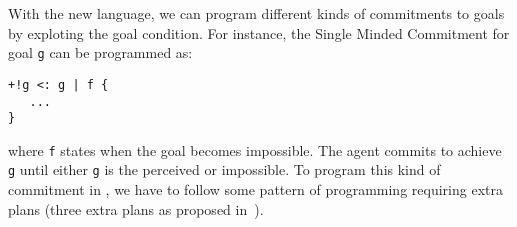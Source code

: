 With the new language, we can program different kinds of commitments to goals~\cite{cohen:90, winikoff:02} by exploting the goal condition. For instance, the Single Minded Commitment for goal \texttt{g} can be programmed as:
\begin{small}
\begin{verbatim}
+!g <: g | f {
   ...
}
\end{verbatim}
\end{small}
where \texttt{f} states when the goal becomes impossible. The agent commits to achieve \texttt{g} until either \texttt{g} is the perceived or impossible. To program this kind of commitment in \asl, we have to follow some pattern of programming requiring extra plans (three extra plans as proposed in~\cite{hubner:06b}).




